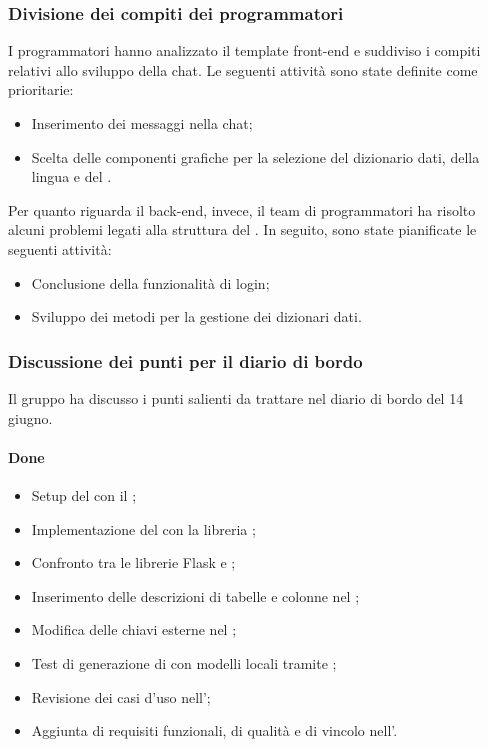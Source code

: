 \subsubsection{Divisione dei compiti dei programmatori}
\par I programmatori hanno analizzato il template front-end e suddiviso i compiti relativi allo sviluppo della chat. Le seguenti attività sono state definite come prioritarie:
\begin{itemize}
	\item Inserimento dei messaggi nella chat;
	\item Scelta delle componenti grafiche per la selezione del dizionario dati, della lingua e del .
\end{itemize}
\par Per quanto riguarda il back-end, invece, il team di programmatori ha risolto alcuni problemi legati alla struttura del . In seguito, sono state pianificate le seguenti attività:
\begin{itemize}
	\item Conclusione della funzionalità di login;
	\item Sviluppo dei metodi per la gestione dei dizionari dati.
\end{itemize}

\subsubsection{Discussione dei punti per il diario di bordo}
\par Il gruppo ha discusso i punti salienti da trattare nel diario di bordo del 14 giugno.
\paragraph{Done}
\begin{itemize}
	\item Setup del  con il  ;
	\item Implementazione del  con la libreria ;
	\item Confronto tra le librerie Flask e ;
	\item Inserimento delle descrizioni di tabelle e colonne nel ;
	\item Modifica delle chiavi esterne nel ;
	\item Test di generazione di  con modelli locali tramite ;
	\item Revisione dei casi d'uso nell'\AdR;
	\item Aggiunta di requisiti funzionali, di qualità e di vincolo nell'\AdR.
	
\end{itemize}
